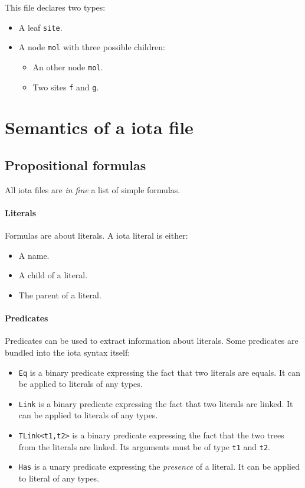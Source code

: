 \documentclass[10pt,a4paper]{article}
\newcommand{\ocaml}{\texttt}
\begin{document}
This file declares two types:

\begin{itemize}
\item A leaf \ocaml{site}.
\item A node \ocaml{mol} with three possible children:
  \begin{itemize}
  \item An other node \ocaml{mol}.
  \item Two sites \ocaml{f} and \ocaml{g}.
  \end{itemize}
\end{itemize}

\section{Semantics of a iota file}

\subsection{Propositional formulas}
All iota files are \emph{in fine} a list of simple formulas.

\paragraph{Literals}
Formulas are about literals. A iota literal is either:
\begin{itemize}
\item A name.
\item A child of a literal.
\item The parent of a literal.
\end{itemize}

\paragraph{Predicates}
Predicates can be used to extract information about literals. Some predicates are bundled into the iota syntax itself:
\begin{itemize}
\item \ocaml{Eq} is a binary predicate expressing the fact that two literals are equals. It can be applied to literals of any types.
\item \ocaml{Link} is a binary predicate expressing the fact that two literals are linked. It can be applied to literals of any types.
\item \ocaml{TLink<t1,t2>} is a binary predicate expressing the fact that the two trees from the literals are linked. Its arguments must be of type \ocaml{t1} and \ocaml{t2}.
\item \ocaml{Has} is a unary predicate expressing the \emph{presence} of a literal. It can be applied to literal of any types.
\end{itemize}
\end{document}
